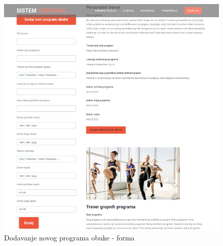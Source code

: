 \begin{figure}[!ht]
\begin{center}
\includegraphics[scale=0.60]{sections/korisnicki_interfejs/screenshots/licenca-admin-nov-program.png}
\end{center}
\caption{Dodavanje novog programa obuke - forma}
\label{fig:novi_program2}
\end{figure}

